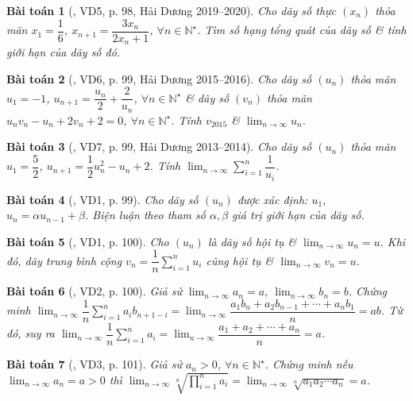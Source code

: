 \documentclass{article}
\newtheorem{baitoan}{Bài toán}
\begin{document}
\begin{baitoan}[\cite{Hung_nang_cao_phat_trien_Toan_11_tap_1}, VD5, p. 98, Hải Dương 2019--2020]
	Cho dãy số thực $(x_n)$ thỏa mãn $x_1 = \dfrac{1}{6}$, $x_{n+1} = \dfrac{3x_n}{2x_n + 1}$, $\forall n\in\mathbb{N}^\star$. Tìm số hạng tổng quát của dãy số \& tính giới hạn của dãy số đó.
\end{baitoan}

\begin{baitoan}[\cite{Hung_nang_cao_phat_trien_Toan_11_tap_1}, VD6, p. 99, Hải Dương 2015--2016]
	Cho dãy số $(u_n)$ thỏa mãn $u_1 = -1$, $u_{n+1} = \dfrac{u_n}{2} + \dfrac{2}{u_n}$, $\forall n\in\mathbb{N}^\star$ \& dãy số $(v_n)$ thỏa mãn $u_nv_n - u_n + 2v_n + 2 = 0$, $\forall n\in\mathbb{N}^\star$. Tính $v_{2015}$ \& $\lim_{n\to\infty} u_n$.
\end{baitoan}

\begin{baitoan}[\cite{Hung_nang_cao_phat_trien_Toan_11_tap_1}, VD7, p. 99, Hải Dương 2013--2014]
	Cho dãy số $(u_n)$ thỏa mãn $u_1 = \dfrac{5}{2}$, $u_{n+1} = \dfrac{1}{2}u_n^2 - u_n + 2$. Tính $\lim_{n\to\infty} \sum_{i=1}^n \dfrac{1}{u_i}$.
\end{baitoan}

\begin{baitoan}[\cite{Hung_nang_cao_phat_trien_Toan_11_tap_1}, VD1, p. 99]
	Cho dãy số $(u_n)$ được xác định: $u_1$, $u_n = \alpha u_{n-1} + \beta$. Biện luận theo tham số $\alpha,\beta$ giá trị giới hạn của dãy số.
\end{baitoan}

\begin{baitoan}[\cite{Hung_nang_cao_phat_trien_Toan_11_tap_1}, VD1, p. 100]
	Cho $(u_n)$ là dãy số hội tụ \& $\lim_{n\to\infty} u_n = u$. Khi đó, dãy trung bình cộng $v_n =  \dfrac{1}{n}\sum_{i=1}^n u_i$ cũng hội tụ \& $\lim_{n\to\infty} v_n = u$.
\end{baitoan}

\begin{baitoan}[\cite{Hung_nang_cao_phat_trien_Toan_11_tap_1}, VD2, p. 100]
	Giả sử $\lim_{n\to\infty} a_n = a$, $\lim_{n\to\infty} b_n = b$. Chứng minh $\lim_{n\to\infty} \dfrac{1}{n}\sum_{i=1}^n a_ib_{n+1-i} = \lim_{n\to\infty} \dfrac{a_1b_n + a_2b_{n-1} + \cdots + a_nb_1}{n} = ab$.  Từ đó, suy ra $\lim_{n\to\infty} \dfrac{1}{n}\sum_{i=1}^n a_i = \lim_{n\to\infty} \dfrac{a_1 + a_2 + \cdots + a_n}{n}= a$.
\end{baitoan}

\begin{baitoan}[\cite{Hung_nang_cao_phat_trien_Toan_11_tap_1}, VD3, p. 101]
	Giả sử $a_n > 0$, $\forall n\in\mathbb{N}^\star$. Chứng minh nếu $\lim_{n\to\infty} a_n = a > 0$ thì $\lim_{n\to\infty} \sqrt[n]{\prod_{i=1}^n a_i} = \lim_{n\to\infty} \sqrt[n]{a_1a_2\cdots a_n} = a$.
\end{baitoan}
\end{document}
